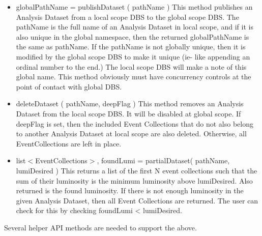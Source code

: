 \documentclass[pdftex]{cmspaper}
\begin{document}
\begin{itemize}
\item  globalPathName = publishDataset ( pathName )
      This method publishes an Analysis Dataset from a local scope DBS
      to the global scope DBS.  The pathName is the full name of an
      Analysis Dataset in local scope, and if it is also unique in the
      global namespace, then the returned globalPathName is the same
      as pathName.  If the pathName is not globally unique, then it
      is modified by the global scope DBS to make it unique (ie- like
      appending an ordinal number to the end.) The local scope DBS will
      make a note of this global name.  This method obviously must have
      concurrency controls at the point of contact with global DBS.

\item  deleteDataset ( pathName, deepFlag ) 
      This method removes an Analysis Dataset from the local scope DBS.
      It will be disabled at global scope.  If deepFlag is set, then
      the included Event Collections that do not also belong to another
      Analysis Dataset at local scope are also deleted.  Otherwise,
      all EventCollections are left in place.

\item  list$<$EventCollections$>$, foundLumi = partialDataset( pathName, lumiDesired )
       This returns a list of the first N event collections such that the sum 
       of their luminosity is the minimum luminosity above lumiDesired.  Also 
       returned is the found luminosity.  If there is not enough luminosity in 
       the given Analysis Dataset, then all Event Collections are returned.  
       The user can check for this by checking foundLumi < lumiDesired.

\end{itemize}

Several helper API methods are needed to support the above.  
\end{document}
